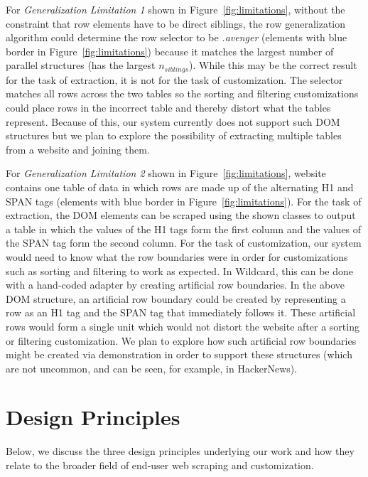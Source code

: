 \documentclass[sigconf,10pt]{acmart}
\begin{document}
For \emph{Generalization Limitation 1} shown in
Figure~\ref{fig:limitations}, without the constraint that row elements
have to be direct siblings, the row generalization algorithm could
determine the row selector to be \emph{.avenger} (elements with blue
border in Figure~\ref{fig:limitations}) because it matches the largest
number of parallel structures (has the largest \(n_{siblings}\)). While
this may be the correct result for the task of extraction, it is not for
the task of customization. The selector matches all rows across the two
tables so the sorting and filtering customizations could place rows in
the incorrect table and thereby distort what the tables represent.
Because of this, our system currently does not support such DOM
structures but we plan to explore the possibility of extracting multiple
tables from a website and joining them.

For \emph{Generalization Limitation 2} shown in
Figure~\ref{fig:limitations}, website contains one table of data in
which rows are made up of the alternating H1 and SPAN tags (elements
with blue border in Figure~\ref{fig:limitations}). For the task of
extraction, the DOM elements can be scraped using the shown classes to
output a table in which the values of the H1 tags form the first column
and the values of the SPAN tag form the second column. For the task of
customization, our system would need to know what the row boundaries
were in order for customizations such as sorting and filtering to work
as expected. In Wildcard, this can be done with a hand-coded adapter by
creating artificial row boundaries. In the above DOM structure, an
artificial row boundary could be created by representing a row as an H1
tag and the SPAN tag that immediately follows it. These artificial rows
would form a single unit which would not distort the website after a
sorting or filtering customization. We plan to explore how such
artificial row boundaries might be created via demonstration in order to
support these structures (which are not uncommon, and can be seen, for
example, in HackerNews).

\hypertarget{sec:design-principles}{%
\section{Design Principles}\label{sec:design-principles}}

Below, we discuss the three design principles underlying our work and
how they relate to the broader field of end-user web scraping and
customization.
\end{document}
